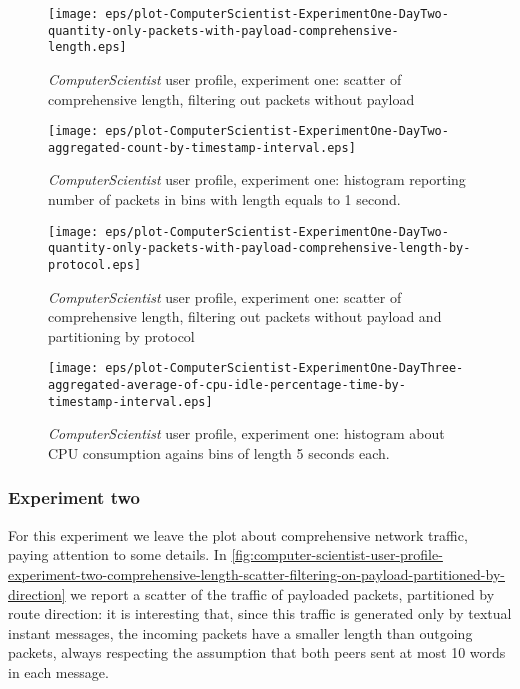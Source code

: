 \documentclass[10pt,a4paper]{article}
\begin{document}
    \begin{figure}
      \centering
      \texttt{[image: eps/plot-ComputerScientist-ExperimentOne-DayTwo-quantity-only-packets-with-payload-comprehensive-length.eps]}
      \caption{\emph{ComputerScientist} user profile, experiment one: scatter
        of comprehensive length, filtering out packets without
        payload}
      \label{fig:computer-scientist-user-profile-comprehensive-length-scatter-filtering-on-payload}
    \end{figure}

    \begin{figure}
      \centering
      \texttt{[image: eps/plot-ComputerScientist-ExperimentOne-DayTwo-aggregated-count-by-timestamp-interval.eps]}
      \caption{\emph{ComputerScientist} user profile, experiment one: histogram
        reporting number of packets in bins with length equals to 1
        second.}
      \label{fig:computer-scientist-user-profile-exp-one-count-histogram}
    \end{figure}

    \begin{figure}
      \centering
      \texttt{[image: eps/plot-ComputerScientist-ExperimentOne-DayTwo-quantity-only-packets-with-payload-comprehensive-length-by-protocol.eps]}
      \caption{\emph{ComputerScientist} user profile, experiment one: scatter
        of comprehensive length, filtering out packets without payload
        and partitioning by protocol}
      \label{fig:computer-scientist-user-profile-comprehensive-length-by-protocol}
    \end{figure}


    \begin{figure}
      \centering
      \texttt{[image: eps/plot-ComputerScientist-ExperimentOne-DayThree-aggregated-average-of-cpu-idle-percentage-time-by-timestamp-interval.eps]}
      \caption{\emph{ComputerScientist} user profile, experiment one:
        histogram about CPU consumption agains bins of length 5
        seconds each.}
      \label{fig:computer-scientist-user-profile-aggregate-cpu-idle-percentage}
    \end{figure}



    \subsubsection*{Experiment two}

    For this experiment we leave the plot about comprehensive network
    traffic, paying attention to some details. In
    \autoref{fig:computer-scientist-user-profile-experiment-two-comprehensive-length-scatter-filtering-on-payload-partitioned-by-direction}
    we report a scatter of the traffic of payloaded packets,
    partitioned by route direction: it is interesting that, since this
    traffic is generated only by textual instant messages, the
    incoming packets have a smaller length than outgoing packets,
    always respecting the assumption that both peers sent at most 10
    words in each message.
\end{document}
